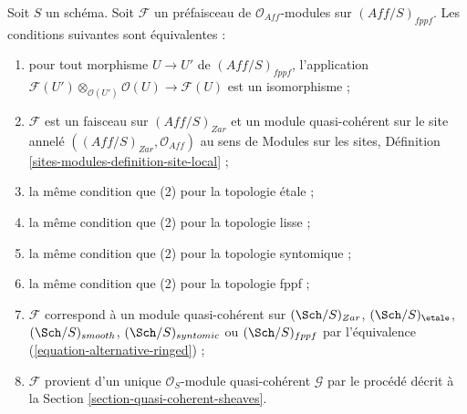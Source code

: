 \begin{lemma}
\label{lemma-quasi-coherent-alternative}
Soit $S$ un schéma. Soit $\mathcal{F}$ un préfaisceau de
$\mathcal{O}_{\textit{Aff}}$-modules sur $(\textit{Aff}/S)_{fppf}$.
Les conditions suivantes sont équivalentes :
\begin{enumerate}
\item pour tout morphisme $U \to U'$ de $(\textit{Aff}/S)_{fppf}$,
l'application
$\mathcal{F}(U') \otimes_{\mathcal{O}(U')} \mathcal{O}(U) \to \mathcal{F}(U)$
est un isomorphisme ;
\item $\mathcal{F}$ est un faisceau sur $(\textit{Aff}/S)_{Zar}$ et un
module quasi-cohérent sur le site annelé
$((\textit{Aff}/S)_{Zar}, \mathcal{O}_{\textit{Aff}})$ au sens de Modules
sur les sites, Définition \ref{sites-modules-definition-site-local} ;
\item la même condition que (2) pour la topologie \'etale ;
\item la même condition que (2) pour la topologie lisse ;
\item la même condition que (2) pour la topologie syntomique ;
\item la même condition que (2) pour la topologie fppf ;
\item $\mathcal{F}$ correspond à un module quasi-cohérent sur
$(\Sch/S)_{Zar}$,
$(\Sch/S)_\etale$,
$(\Sch/S)_{smooth}$,
$(\Sch/S)_{syntomic}$ ou
$(\Sch/S)_{fppf}$ par l'équivalence
(\ref{equation-alternative-ringed}) ;
\item $\mathcal{F}$ provient d'un unique $\mathcal{O}_S$-module
quasi-cohérent $\mathcal{G}$ par le procédé décrit à la Section
\ref{section-quasi-coherent-sheaves}.
\end{enumerate}
\end{lemma}

